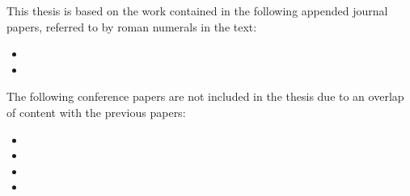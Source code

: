
\begin{refsection}

This thesis is based on the work contained in the following appended journal papers,
referred to by roman numerals in the text:
\begin{itemize}
 \item {} %
 \item {} %
\end{itemize}
The following conference papers are not included in the thesis due to an overlap
of content with the previous papers:
\begin{itemize}
 \item {} %
 \item {} %
 \item {} %
 \item {} %
\end{itemize}


\end{refsection}
